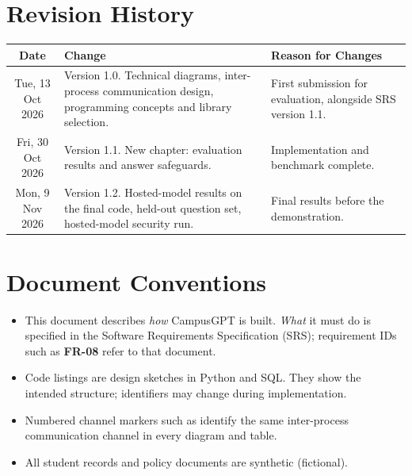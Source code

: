 \documentclass[11pt,a4paper,oneside]{report}
\begin{document}

\setcounter{page}{1}
\tableofcontents
\listoffigures
\listoftables
\lstlistoflistings

\chapter*{Revision History}
\begin{tabularx}{\textwidth}{|c|Y|Y|}
\hline
\textbf{Date} & \textbf{Change} & \textbf{Reason for Changes}\\
\hline
Tue, 13 Oct 2026 & Version 1.0. Technical diagrams, inter-process communication design,
programming concepts and library selection. & First submission for evaluation, alongside
SRS version 1.1.\\
\hline
Fri, 30 Oct 2026 & Version 1.1. New chapter: evaluation results and answer safeguards. &
Implementation and benchmark complete.\\
\hline
Mon, 9 Nov 2026 & Version 1.2. Hosted-model results on the final code, held-out question
set, hosted-model security run. & Final results before the demonstration.\\
\hline
\end{tabularx}

\chapter*{Document Conventions}
\begin{itemize}
  \item This document describes \emph{how} CampusGPT is built. \emph{What} it must do is
        specified in the Software Requirements Specification (SRS); requirement IDs such
        as \textbf{FR-08} refer to that document.
  \item Code listings are design sketches in Python and SQL. They show the intended
        structure; identifiers may change during implementation.
  \item Numbered channel markers such as  identify the same inter-process
        communication channel in every diagram and table.
  \item All student records and policy documents are synthetic (fictional).
\end{itemize}

\clearpage
{}
\setcounter{page}{1}
\end{document}

